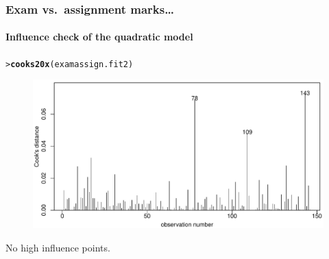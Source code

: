 \documentclass{beamer}\usepackage[]{graphicx}\usepackage[]{xcolor}
\makeatletter
\newcommand{\hlstd}[1]{\textcolor[rgb]{0.345,0.345,0.345}{#1}}%
\newcommand{\hlkwd}[1]{\textcolor[rgb]{0.737,0.353,0.396}{\textbf{#1}}}%
\newenvironment{kframe}{%
 \def\at@end@of@kframe{}%
 \ifinner\ifhmode%
  \def\at@end@of@kframe{\end{minipage}}%
  \begin{minipage}{\columnwidth}%
 \fi\fi%
 \def\FrameCommand##1{\hskip\@totalleftmargin \hskip-\fboxsep
 \colorbox{shadecolor}{##1}\hskip-\fboxsep
     \hskip-\linewidth \hskip-\@totalleftmargin \hskip\columnwidth}%
 \MakeFramed {\advance\hsize-\width
   \@totalleftmargin\z@ \linewidth\hsize
   \@setminipage}}%
 {\par\unskip\endMakeFramed%
 \at@end@of@kframe}
\newenvironment{knitrout}{}{} %
\makeatother
\begin{document}
\begin{frame}[fragile]
\frametitle{Exam vs.\ assignment marks\ldots}
\framesubtitle{Influence check of the quadratic model}

\begin{knitrout}\scriptsize
{}\color{fgcolor}\begin{kframe}
\begin{alltt}
\hlstd{> }\hlkwd{cooks20x}\hlstd{(examassign.fit2)}
\end{alltt}
\end{kframe}
\end{knitrout}



\begin{figure}
  \centering
  \includegraphics[scale=0.5]{figure/RC-H04-016}
\end{figure}

No high influence points.
\end{frame}
\end{document}

